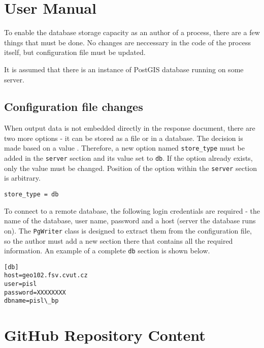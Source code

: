 \chapter{User Manual}
\label{User-Manual}

To enable the database storage capacity as an author of a process, there are a few things that must be done. No changes are neccessary in the code of the process itself, but configuration file must be updated. 

It is assumed that there is an instance of PostGIS database running on some server.


\section{Configuration file changes}

When output data is not embedded directly in the response document, there are two more options - it can be stored as a file or in a database. The decision is made based on a value . Therefore, a new option named \texttt{store\_type} must be added in the \texttt{server} section and its value set to \texttt{db}. If the option already exists, only the value must be changed. Position of the option within the \texttt{server} section is arbitrary.

\begin{verbatim}
store_type = db
\end{verbatim}


To connect to a remote database, the following login credentials are required - the name of the database, user name, password and a host (server the database runs on). The \texttt{PgWriter} class is designed to extract them from the configuration file, so the author must add a new section there that contains all the required information. An example of a complete  \texttt{db} section is shown below.

\begin{verbatim}
[db]
host=geo102.fsv.cvut.cz
user=pisl
password=XXXXXXXX
dbname=pisl\_bp
\end{verbatim}







\chapter{GitHub Repository Content}
\label{cd}


